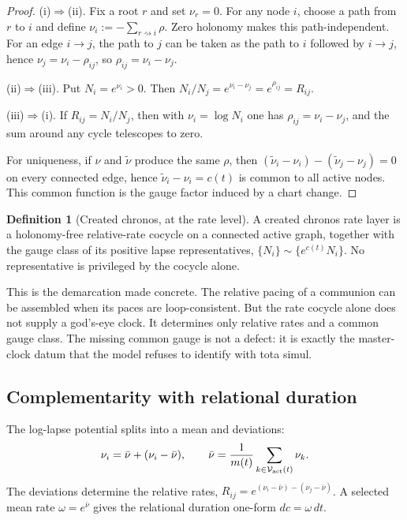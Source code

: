 \documentclass[11pt,a4paper]{article}
\def\mathfrak#1{#1}%
\def\textit#1{#1}%
\theoremstyle{definition}
\newtheorem{definition}{Definition}[section]
\theoremstyle{plain}
\theoremstyle{remark}
\begin{document}
\begin{proof}
(i)\(\Rightarrow\)(ii). Fix a root \(r\) and set \(\nu_r=0\). For any node \(i\),
choose a path from \(r\) to \(i\) and define \(\nu_i:=-\sum_{r\rightsquigarrow i}\rho\).
Zero holonomy makes this path-independent. For an edge \(i\to j\), the path to
\(j\) can be taken as the path to \(i\) followed by \(i\to j\), hence
\(\nu_j=\nu_i-\rho_{ij}\), so \(\rho_{ij}=\nu_i-\nu_j\).

(ii)\(\Rightarrow\)(iii). Put \(N_i=e^{\nu_i}>0\). Then
\(N_i/N_j=e^{\nu_i-\nu_j}=e^{\rho_{ij}}=R_{ij}\).

(iii)\(\Rightarrow\)(i). If \(R_{ij}=N_i/N_j\), then with \(\nu_i=\log N_i\) one has
\(\rho_{ij}=\nu_i-\nu_j\), and the sum around any cycle telescopes to zero.

For uniqueness, if \(\nu\) and \(\tilde\nu\) produce the same \(\rho\), then
\((\tilde\nu_i-\nu_i)-(\tilde\nu_j-\nu_j)=0\) on every connected edge, hence
\(\tilde\nu_i-\nu_i=c(t)\) is common to all active nodes. This common function is
the gauge factor induced by a chart change.
\end{proof}

\begin{definition}[Created chronos, at the rate level]
A created chronos rate layer is a holonomy-free relative-rate cocycle on a
connected active graph, together with the gauge class of its positive lapse
representatives, \(\{N_i\}\sim\{e^{c(t)}N_i\}\). No representative is privileged by
the cocycle alone.
\end{definition}

This is the demarcation made concrete. The relative pacing of a communion can be
assembled when its paces are loop-consistent. But the rate cocycle alone does not
supply a god's-eye clock. It determines only relative rates and a common gauge
class. The missing common gauge is not a defect: it is exactly the master-clock
datum that the model refuses to identify with \textit{tota simul}.

\subsection{Complementarity with relational duration}

The log-lapse potential splits into a mean and deviations:
\[
\nu_i
=
\bar\nu
+
(\nu_i-\bar\nu),
\qquad
\bar\nu
=
\frac1{m(t)}
\sum_{k\in\mathcal V_{\rm act}(t)}
\nu_k.
\]
The deviations determine the relative rates,
\(R_{ij}=e^{(\nu_i-\bar\nu)-(\nu_j-\bar\nu)}\). A selected mean rate
\(\omega=e^{\bar\nu}\) gives the relational duration one-form \(d\mathfrak c=\omega\,dt\).
\end{document}

